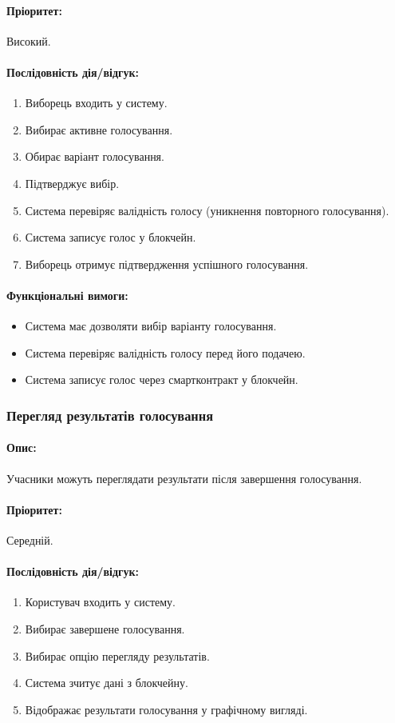 \documentclass[14pt]{extreport}
\newcounter{req}[subsubsection]
\newcommand\req{\arabic{req}\stepcounter{req}}
\begin{document}
  \paragraph{Пріоритет:} Високий.  
  \paragraph{Послідовність дія/відгук:}  
  \begin{enumerate}  
      \item Виборець входить у систему.  
      \item Вибирає активне голосування.  
      \item Обирає варіант голосування.  
      \item Підтверджує вибір.  
      \item Система перевіряє валідність голосу (уникнення повторного голосування).  
      \item Система записує голос у блокчейн.  
      \item Виборець отримує підтвердження успішного голосування.  
  \end{enumerate}  
  \paragraph{Функціональні вимоги:}  
  \begin{itemize}[leftmargin=*,label=REQ-.\req:]  
      \item Система має дозволяти вибір варіанту голосування.  
      \item Система перевіряє валідність голосу перед його подачею.  
      \item Система записує голос через смартконтракт у блокчейн.  
  \end{itemize}  

  \subsubsection{Перегляд результатів голосування}  
  \paragraph{Опис:} Учасники можуть переглядати результати після завершення голосування.  
  \paragraph{Пріоритет:} Середній.  
  \paragraph{Послідовність дія/відгук:}  
  \begin{enumerate}  
      \item Користувач входить у систему.  
      \item Вибирає завершене голосування.  
      \item Вибирає опцію перегляду результатів.  
      \item Система зчитує дані з блокчейну.  
      \item Відображає результати голосування у графічному вигляді.  
  \end{enumerate}  
\end{document}
